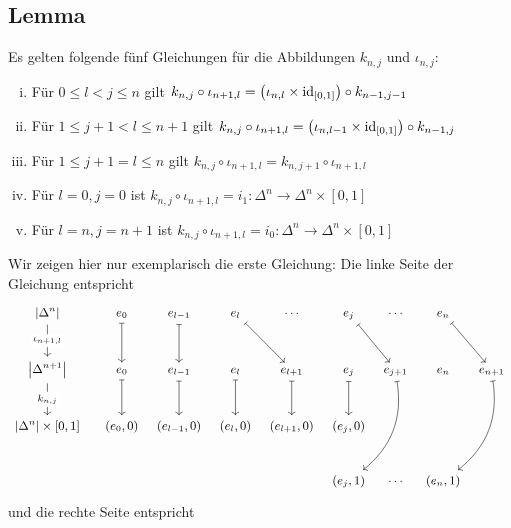 \subsection[Lemma: Gleichungen für die Abbildungen aus \ref{sub:710}]{Lemma} %
\label{sub:711}
Es gelten folgende fünf Gleichungen für die Abbildungen $k_{n,j}$ und $\iota_{n,j}$:
\begin{enumerate}[(i)]
	\item Für $0 \le l < j \le n$ gilt $k_{n,j} \circ \iota_{n+1,l} = \enbrace*{\iota_{n,l} \times \id_{[0,1]}} \circ k_{n-1,j-1}$
	\item Für $1 \le j+1 < l \le n+1$ gilt $k_{n,j} \circ \iota_{n+1,l} = \enbrace*{\iota_{n,l-1} \times \id_{[0,1]}} \circ k_{n-1,j} $
	\item Für $1 \le j+1 = l \le n$ gilt $k_{n,j} \circ \iota_{n+1,l} = k_{n,j+1} \circ \iota_{n+1,l}$
	\item Für $l=0,j=0$ ist $k_{n,j} \circ \iota_{n+1,l} = i_1 :  \Delta^n \to \Delta^n \times [0,1]$
	\item Für $l=n,j=n+1$ ist $k_{n,j} \circ \iota_{n+1,l} = i_0 : \Delta^n \to \Delta^n \times [0,1]$
\end{enumerate}
Wir zeigen hier nur exemplarisch die erste Gleichung:
Die linke Seite der Gleichung entspricht
	\[
		\begin{tikzcd}[row sep=2.4em, column sep=0.5em, font=\small]
			\abs*{\Delta^n} \dar["\iota_{n+1,l}" description] && e_0 \dar[mapsto] & e_{l-1} \dar[mapsto] & e_l \drar[mapsto]& \cdots & e_j \drar[mapsto]& \cdots 
			& e_n \drar[mapsto]& \\
			\abs*{\Delta^{n+1}} \dar["k_{n,j}" description] && e_0 \dar[mapsto] & e_{l-1} \dar[mapsto] & e_l \dar[mapsto] & e_{l+1} \dar[mapsto]& e_{j} \dar[mapsto] 
			& e_{j+1} \arrow[ddl,mapsto, bend left] & e_n & e_{n+1} \arrow[ddl,mapsto, bend left] \\
			\abs*{\Delta^{n}} \times [0,1] && (e_0,0) & (e_{l-1},0) & (e_l,0) & (e_{l+1},0)& (e_j,0) & & \\
			 &&  &  &  & & (e_j,1) & \cdots & (e_n,1)
		\end{tikzcd}
	\]
	und die rechte Seite entspricht
